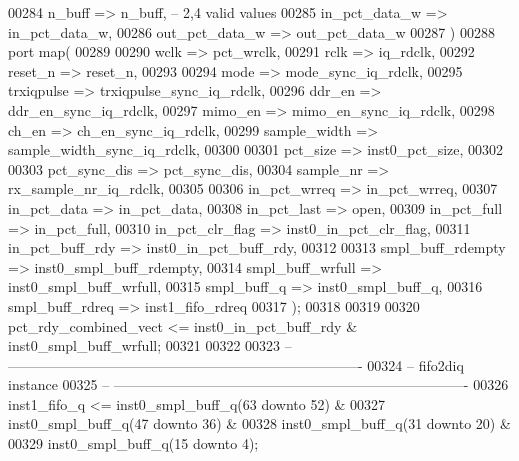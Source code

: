 \begin{DoxyCode}
00284       n_buff            => n_buff,\textcolor{keyword}{ -- 2,4 valid values}
00285       in_pct_data_w     => in_pct_data_w,
00286       out_pct_data_w    => out_pct_data_w
00287    \textcolor{vhdlchar}{)}
00288    \textcolor{keywordflow}{port} \textcolor{keywordflow}{map}(
00289 
00290       wclk              => pct_wrclk,
00291       rclk              => iq_rdclk, 
00292       reset_n           => reset_n,
00293       
00294       mode              => mode_sync_iq_rdclk, 
00295       trxiqpulse        => trxiqpulse_sync_iq_rdclk,    
00296       ddr_en            => ddr_en_sync_iq_rdclk,
00297       mimo_en           => mimo_en_sync_iq_rdclk,   
00298       ch_en             => ch_en_sync_iq_rdclk,
00299       sample_width      => sample_width_sync_iq_rdclk,
00300       
00301       pct_size          => inst0_pct_size,
00302       
00303       pct_sync_dis      => pct_sync_dis,
00304       sample_nr         => rx_sample_nr_iq_rdclk,
00305       
00306       in_pct_wrreq      => in_pct_wrreq,
00307       in_pct_data       => in_pct_data,
00308       in_pct_last       => \textcolor{keywordflow}{open},
00309       in_pct_full       => in_pct_full,
00310       in_pct_clr_flag   => inst0_in_pct_clr_flag,
00311       in_pct_buff_rdy   => inst0_in_pct_buff_rdy,
00312       
00313       smpl_buff_rdempty => inst0_smpl_buff_rdempty,
00314       smpl_buff_wrfull  => inst0_smpl_buff_wrfull,
00315       smpl_buff_q       => inst0_smpl_buff_q,    
00316       smpl_buff_rdreq   => inst1_fifo_rdreq
00317         \textcolor{vhdlchar}{)};
00318         
00319         
00320 \textcolor{vhdlchar}{pct_rdy_combined_vect} \textcolor{vhdlchar}{<=} \textcolor{vhdlchar}{inst0_in_pct_buff_rdy} \textcolor{vhdlchar}{&} \textcolor{vhdlchar}{inst0_smpl_buff_wrfull};
00321         
00322                
00323 \textcolor{keyword}{-- ----------------------------------------------------------------------------}
00324 \textcolor{keyword}{-- fifo2diq instance}
00325 \textcolor{keyword}{-- ----------------------------------------------------------------------------       }
00326 inst1\_fifo\_q <=   inst0\_smpl\_buff\_q(\textcolor{vhdllogic}{63} \textcolor{keywordflow}{downto} \textcolor{vhdllogic}{52}) & 
00327                   inst0\_smpl\_buff\_q(\textcolor{vhdllogic}{47} \textcolor{keywordflow}{downto} \textcolor{vhdllogic}{36}) &
00328                   inst0\_smpl\_buff\_q(\textcolor{vhdllogic}{31} \textcolor{keywordflow}{downto} \textcolor{vhdllogic}{20}) & 
00329                   inst0\_smpl\_buff\_q(\textcolor{vhdllogic}{15} \textcolor{keywordflow}{downto} \textcolor{vhdllogic}{4});

\end{DoxyCode}
